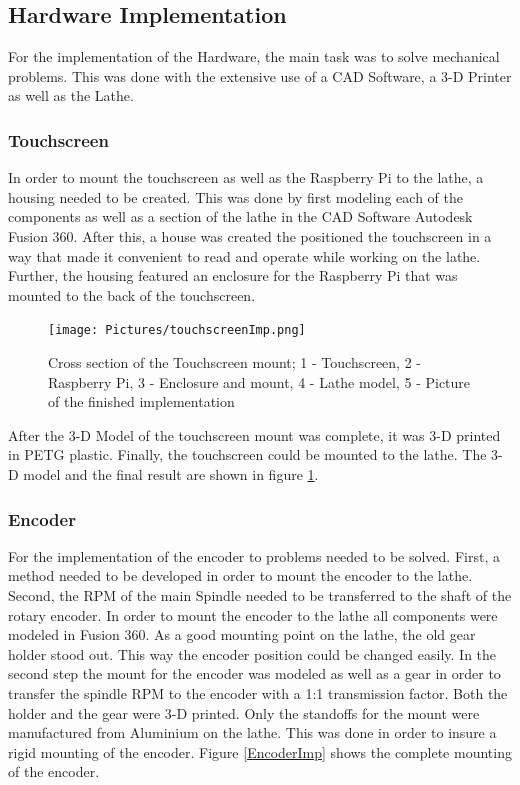 \subsection{Hardware Implementation}
For the implementation of the Hardware, the main task was to solve mechanical problems. This was done with the extensive use of a CAD Software, a 3-D Printer as well as the Lathe.

\subsubsection{Touchscreen}
In order to mount the touchscreen as well as the Raspberry Pi to the lathe, a housing needed to be created. This was done by first modeling each of the components as well as a section of the lathe in the CAD Software Autodesk Fusion 360. After this, a house was created the positioned the touchscreen in a way that made it convenient to read and operate while working on the lathe. Further, the housing featured an enclosure for the Raspberry Pi that was mounted to the back of the touchscreen.

\begin{figure}
    \begin{center}
    \texttt{[image: Pictures/touchscreenImp.png]}
    \caption[Cross section of the Touchscreen mount]{Cross section of the Touchscreen mount; 1 - Touchscreen, 2 - Raspberry Pi, 3 - Enclosure and mount, 4 - Lathe model, 5 - Picture of the finished implementation}
    \label{touchscreenImp}
    \end{center}
\end{figure}

After the 3-D Model of the touchscreen mount was complete, it was 3-D printed in PETG plastic. Finally, the touchscreen could be mounted to the lathe. The 3-D model and the final result are shown in figure \ref{touchscreenImp}.

\subsubsection{Encoder}
For the implementation of the encoder to problems needed to be solved. First, a method needed to be developed in order to mount the encoder to the lathe. Second, the RPM of the main Spindle needed to be transferred to the shaft of the rotary encoder.
In order to mount the encoder to the lathe all components were modeled in Fusion 360. As a good mounting point on the lathe, the old gear holder stood out. This way the encoder position could be changed easily. In the second step the mount for the encoder was modeled as well as a gear in order to transfer the spindle RPM to the encoder with a 1:1 transmission factor. Both the holder and the gear were 3-D printed. Only the standoffs for the mount were manufactured from Aluminium on the lathe. This was done in order to insure a rigid mounting of the encoder. Figure \ref{EncoderImp} shows the complete mounting of the encoder.


